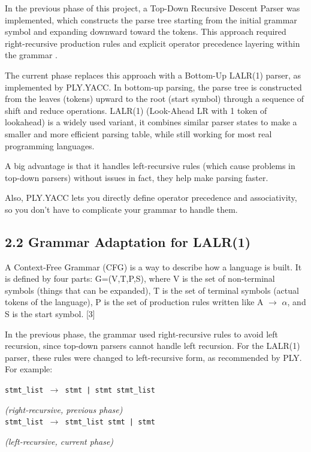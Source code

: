 \documentclass[letterpaper,12pt,oneside]{article}
\begin{document}
In the previous phase of this project, a Top-Down Recursive Descent Parser was implemented, which constructs the parse tree starting from the initial grammar symbol and expanding downward toward the tokens. This approach required right-recursive production rules and explicit operator precedence layering within the grammar .

The current phase replaces this approach with a Bottom-Up LALR(1) parser, as implemented by PLY.YACC. In bottom-up parsing, the parse tree is constructed from the leaves (tokens) upward to the root (start symbol) through a sequence of shift and reduce operations. LALR(1) (Look-Ahead LR with 1 token of lookahead) is a widely used variant, it combines similar parser states to make a smaller and more efficient parsing table, while still working for most real programming languages.

A big advantage is that it handles left-recursive rules (which cause problems in top-down parsers) without issues in fact, they help make parsing faster.

Also, PLY.YACC lets you directly define operator precedence and associativity, so you don’t have to complicate your grammar to handle them.

\subsection*{2.2 Grammar Adaptation for LALR(1)}

A Context-Free Grammar (CFG) is a way to describe how a language is built. It is defined by four parts: G=(V,T,P,S), where V is the set of non-terminal symbols (things that can be expanded), T is the set of terminal symbols (actual tokens of the language), P is the set of production rules written like A $\rightarrow$ $\alpha$, and S is the start symbol. [3]

In the previous phase, the grammar used right-recursive rules to avoid left recursion, since top-down parsers cannot handle left recursion. For the LALR(1) parser, these rules were changed to left-recursive form, as recommended by PLY. For example:

\begin{center} 

\texttt{stmt\_list $\rightarrow$ stmt | stmt stmt\_list} \quad

\textit{(right-recursive, previous phase)}\\ 

\texttt{stmt\_list $\rightarrow$ stmt\_list stmt | stmt} \quad 

\textit{(left-recursive, current phase)} 

\end{center}
\end{document}
